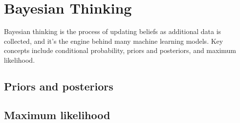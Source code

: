 \section{Bayesian Thinking}
Bayesian thinking is the process of updating beliefs as additional data is collected, and it's the engine behind many machine learning models.
Key concepts include conditional probability, priors and posteriors, and maximum likelihood.

\subsection{Priors and posteriors}

\subsection{Maximum likelihood}